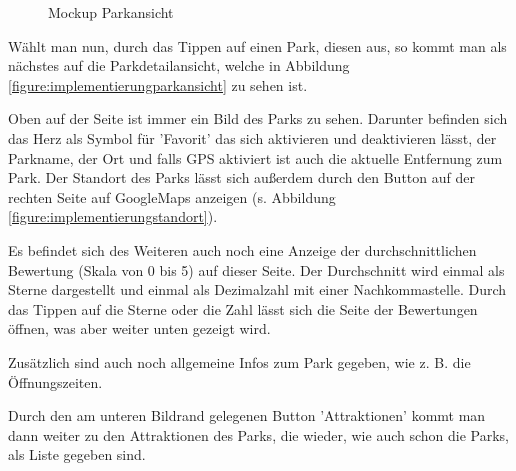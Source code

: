 \begin{figure}[h]
\begin{minipage}{0.49\textwidth}
        \caption{Mockup Parkansicht}
    \end{minipage}
\end{figure}

Wählt man nun, durch das Tippen auf einen Park, diesen aus, so kommt man als nächstes auf die Parkdetailansicht, welche in Abbildung \ref{figure:implementierungparkansicht} zu sehen ist. 

Oben auf der Seite ist immer ein Bild des Parks zu sehen. Darunter befinden sich das Herz als Symbol für 'Favorit' das sich aktivieren und deaktivieren lässt, der Parkname, der Ort und falls GPS aktiviert ist auch die aktuelle Entfernung zum Park. Der Standort des Parks lässt sich außerdem durch den Button auf der rechten Seite auf GoogleMaps anzeigen (s. Abbildung \ref{figure:implementierungstandort}). 

Es befindet sich des Weiteren auch noch eine Anzeige der durchschnittlichen Bewertung (Skala von 0 bis 5) auf dieser Seite. Der Durchschnitt wird einmal als Sterne dargestellt und einmal als Dezimalzahl mit einer Nachkommastelle. Durch das Tippen auf die Sterne oder die Zahl lässt sich die Seite der Bewertungen öffnen, was aber weiter unten gezeigt wird. 

Zusätzlich sind auch noch allgemeine Infos zum Park gegeben, wie z. B. die Öffnungszeiten. 

Durch den am unteren Bildrand gelegenen Button 'Attraktionen' kommt man dann weiter zu den Attraktionen des Parks, die wieder, wie auch schon die Parks, als Liste gegeben sind.

